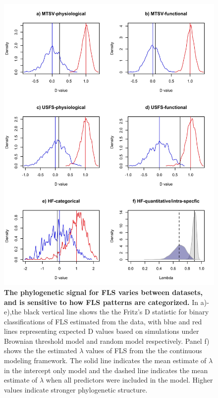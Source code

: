 \documentclass[11pt]{article}
\begin{document}
\begin{figure}[H]
\centering
\includegraphics[height=0.8\textheight]{..//..//phylosig.jpeg} 
  \caption{\textbf{The phylogenetic signal for FLS varies between datasets, and is sensitive to how FLS patterns are categorized.} In a)-e),the black vertical line shows the the Fritz's D statistic for binary classifications of FLS estimated from the data, with blue and red lines representing expected D values based on simulations under Brownian threshold model and random model respectively. Panel f) shows the the estimated $\lambda$ values of FLS from the the continuous modeling framework. The solid line indicates the mean estimate of $\lambda$ in the intercept only model and the dashed line indicates the mean estimate of $\lambda$ when all predictors were included in the model. Higher values indicate stronger phylogenetic structure.}
    \label{fig:Dstat}
    \end{figure}
\end{document}
